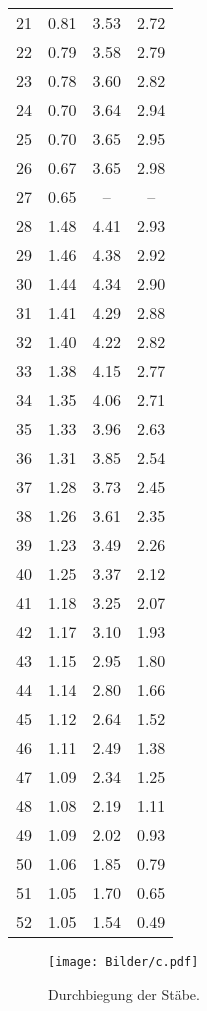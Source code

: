 \begin{table}
\begin{tabular}{cccc}
		21 & 0.81 & 3.53 & 2.72 \\
		22 & 0.79 & 3.58 & 2.79 \\
		23 & 0.78 & 3.60 & 2.82 \\
		24 & 0.70 & 3.64 & 2.94 \\
		25 & 0.70 & 3.65 & 2.95 \\
		26 & 0.67 & 3.65 & 2.98 \\
		27 & 0.65 & -- & -- \\
		28 & 1.48 & 4.41 & 2.93 \\
		29 & 1.46 & 4.38 & 2.92 \\
		30 & 1.44 & 4.34 & 2.90 \\
		31 & 1.41 & 4.29 & 2.88 \\
		32 & 1.40 & 4.22 & 2.82 \\
		33 & 1.38 & 4.15 & 2.77 \\
		34 & 1.35 & 4.06 & 2.71 \\
		35 & 1.33 & 3.96 & 2.63 \\
		36 & 1.31 & 3.85 & 2.54 \\
		37 & 1.28 & 3.73 & 2.45 \\
		38 & 1.26 & 3.61 & 2.35 \\
		39 & 1.23 & 3.49 & 2.26 \\
		40 & 1.25 & 3.37 & 2.12 \\
		41 & 1.18 & 3.25 & 2.07 \\
		42 & 1.17 & 3.10 & 1.93 \\
		43 & 1.15 & 2.95 & 1.80 \\
		44 & 1.14 & 2.80 & 1.66 \\
		45 & 1.12 & 2.64 & 1.52 \\
		46 & 1.11 & 2.49 & 1.38 \\
		47 & 1.09 & 2.34 & 1.25 \\
		48 & 1.08 & 2.19 & 1.11 \\
		49 & 1.09 & 2.02 & 0.93 \\
		50 & 1.06 & 1.85 & 0.79 \\
		51 & 1.05 & 1.70 & 0.65 \\
		52 & 1.05 & 1.54 & 0.49 \\
		\bottomrule
	\end{tabular}
\end{table}

\begin{figure}
	\centering
	\texttt{[image: Bilder/c.pdf]}
	\caption{Durchbiegung der Stäbe.}
	\label{fig:Stabus}
\end{figure}


